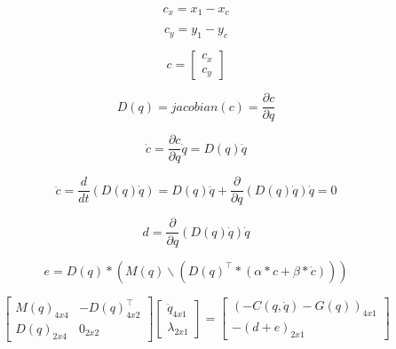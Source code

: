 \documentclass{article}
\begin{document}
\begin{equation}
	c_x = x_1 - x_c
\end{equation}

\begin{equation}
	c_y = y_1 - y_c
\end{equation}

\begin{equation}
	c = \begin{bmatrix}
	c_x\\
	c_y
	\end{bmatrix}
\end{equation}

\begin{equation}
	D(q) = jacobian(c) = \frac{\partial c}{\partial q}
\end{equation}

\begin{equation}
	\dot{c} = \frac{\partial c}{\partial q} \dot{q} = D(q)\dot{q}
\end{equation}

\begin{equation}
	\ddot{c} = \frac{d}{dt}(D(q)\dot{q}) = D(q)\ddot{q} +  \frac{\partial }{\partial q}(D(q)\dot{q})\dot{q} = 0
\end{equation}

\begin{equation}
	d = \frac{\partial }{\partial q}(D(q)\dot{q})\dot{q}
\end{equation}

\begin{equation}
	e = D(q)*(M(q)\backslash(D(q)^\top *(\alpha*c + \beta*\dot{c})))
\end{equation}

\begin{equation}
	\begin{bmatrix}
	M(q)_{4x4} & -D(q)^\top_{4x2}\\
	D(q)_{2x4} & 0_{2x2}
	\end{bmatrix}
	\begin{bmatrix}
	\ddot{q}_{4x1}\\
	\lambda_{2x1}
	\end{bmatrix} = 
	\begin{bmatrix}
	(- C(q, \dot{q}) - G(q))_{4x1}\\
	-(d + e)_{2x1}
	\end{bmatrix}
\end{equation}
\end{document}
